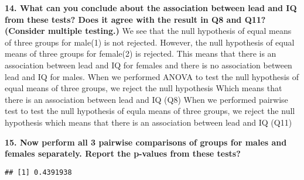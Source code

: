 \documentclass[
]{article}
\newenvironment{Shaded}{\begin{snugshade}}{\end{snugshade}}
\newcommand{\AttributeTok}[1]{\textcolor[rgb]{0.77,0.63,0.00}{#1}}
\newcommand{\DecValTok}[1]{\textcolor[rgb]{0.00,0.00,0.81}{#1}}
\newcommand{\FunctionTok}[1]{\textcolor[rgb]{0.00,0.00,0.00}{#1}}
\newcommand{\NormalTok}[1]{#1}
\newcommand{\OtherTok}[1]{\textcolor[rgb]{0.56,0.35,0.01}{#1}}
\newcommand{\SpecialCharTok}[1]{\textcolor[rgb]{0.00,0.00,0.00}{#1}}
\begin{document}
\textbf{14. What can you conclude about the association between lead and
IQ from these tests? Does it agree with the result in Q8 and Q11?
(Consider multiple testing.)} We see that the null hypothesis of equal
means of three groups for male(1) is not rejected. However, the null
hypothesis of equal means of three groups for female(2) is rejected.
This means that there is an association between lead and IQ for females
and there is no association between lead and IQ for males. When we
performed ANOVA to test the null hypothesis of equal means of three
groups, we reject the null hypothesis Which means that there is an
association between lead and IQ (Q8) When we performed pairwise test to
test the null hypothesis of equla means of three groups, we reject the
null hypothesis which means that there is an association between lead
and IQ (Q11)

\textbf{15. Now perform all 3 pairwise comparisons of groups for males
and females separately. Report the p-values from these tests?}

\begin{Shaded}
\end{Shaded}

\begin{verbatim}
## [1] 0.4391938
\end{verbatim}

\begin{Shaded}
\end{Shaded}
\end{document}
